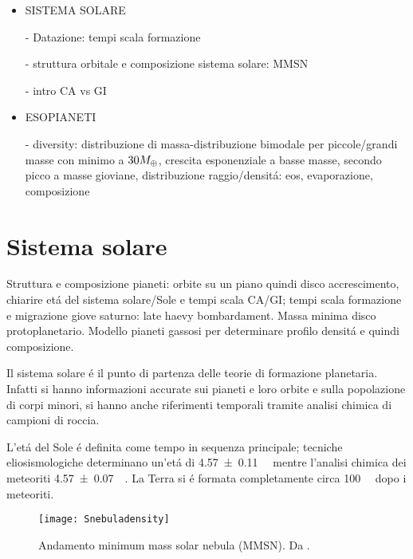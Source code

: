 \begin{workout}
\begin{itemize}
\item SISTEMA SOLARE
\item[-] Datazione: tempi scala formazione
\item[-] struttura orbitale e composizione sistema solare: MMSN
\item[-] intro CA vs GI
\item ESOPIANETI
\item[-] diversity: distribuzione di massa-distribuzione bimodale per piccole/grandi masse con minimo a $30M_{\oplus}$, crescita esponenziale a basse masse, secondo picco a masse gioviane, distribuzione raggio/densit\'a: eos, evaporazione, composizione
\end{itemize}
\end{workout}
{\let\clearpage\relax\let\cleardoublepage\relax
\chapter{Sistema solare}
}

\begin{workout}
Struttura e composizione pianeti: orbite su un piano quindi disco accrescimento, chiarire et\'a del sistema solare/Sole e tempi scala CA/GI; tempi scala formazione e migrazione giove saturno: late haevy bombardament. Massa minima disco protoplanetario. Modello pianeti gassosi per determinare profilo densit\'a e quindi composizione.
\end{workout}

Il sistema solare \'e il punto di partenza delle teorie di formazione planetaria. Infatti si hanno informazioni accurate sui pianeti e loro orbite e sulla popolazione di corpi minori, si hanno anche riferimenti temporali tramite analisi chimica di campioni di roccia.

L'et\'a del Sole \'e definita come tempo in sequenza principale; tecniche eliosismologiche determinano un'et\'a di \SI{4.57+-0.11}{\giga\year} mentre l'analisi chimica dei meteoriti \SI{4.57+-0.07}{\giga\year}.
La Terra si \'e formata completamente circa \SI{100}{\mega\year} dopo i meteoriti.

\begin{figure}[!ht]
\texttt{[image: Snebuladensity]}\caption{Andamento minimum mass solar nebula (MMSN). Da \cite{weidenschilling1977distribution}.}\label{fig:Snebuladensity}
\end{figure}

